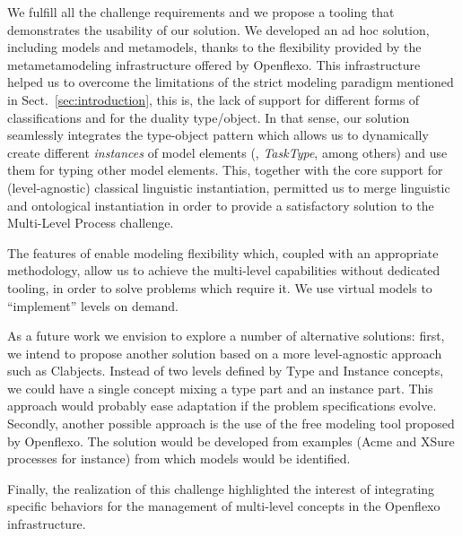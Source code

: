 

We fulfill all the challenge requirements and we propose a tooling that
demonstrates the usability of our solution. We developed an ad hoc solution,
including models and metamodels, thanks to the flexibility provided by the
metametamodeling infrastructure offered by Openflexo. This infrastructure
helped us to overcome the limitations of the strict modeling paradigm mentioned
in Sect.~\ref{sec:introduction}, this is, the lack of support for different
forms of classifications and for the duality type/object. In that sense, our
solution seamlessly integrates the type-object pattern which allows us to
dynamically create different \emph{instances} of model elements (\eg, \emph{TaskType}, among others) and use them for typing other model elements. This, together with the \FML core support for (level-agnostic) classical linguistic instantiation, permitted us to merge linguistic and ontological instantiation in order to provide a satisfactory solution to the Multi-Level Process challenge.

The features of \FML enable modeling flexibility which, coupled with an appropriate methodology, allow us to achieve 
the multi-level capabilities without dedicated tooling, in order to solve
problems which require it. We use virtual models to \enquote{implement} levels on demand.


As a future work we envision to explore a number of alternative solutions:
first, we intend to propose another solution based on a more level-agnostic
approach such as Clabjects. Instead of two levels defined by Type and Instance
concepts, we could have a single concept mixing a type part and an instance
part. This approach would probably ease adaptation if the problem
specifications evolve. Secondly, another possible approach is the use of the
free modeling tool proposed by Openflexo. The solution would be developed from
examples (Acme and XSure processes for instance) from which models would be
identified.

Finally, the realization of this challenge highlighted the interest
of integrating specific behaviors for the management of multi-level concepts in
the Openflexo infrastructure. %
